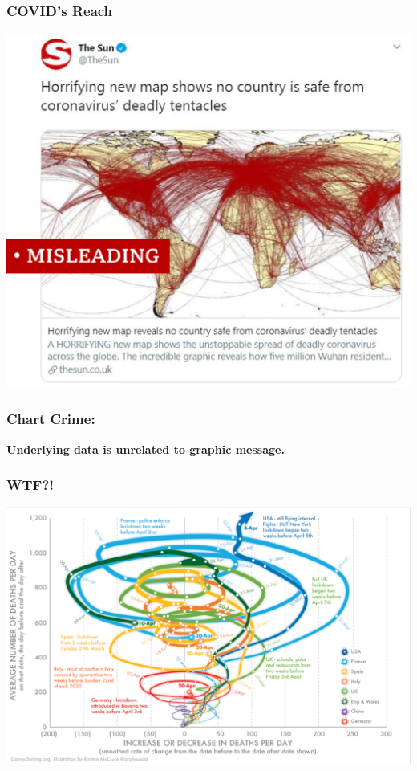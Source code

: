 \documentclass[aspectratio=169]{beamer}
\theoremstyle{principle}
\begin{document}
\begin{frame}
\frametitle{COVID's Reach}
\begin{center}
\includegraphics[scale=0.35]{COVID_but_not.png}
\end{center}

\end{frame}

\begin{frame}
\frametitle{Chart Crime:}

\begin{center}
\huge \textbf{Underlying data is unrelated to graphic message.}
\end{center}

\end{frame}

\begin{frame}
\frametitle{WTF?!}
\begin{center}
\includegraphics[scale=0.4]{crazy_chart.png}
\end{center}

\end{frame}
\end{document}
